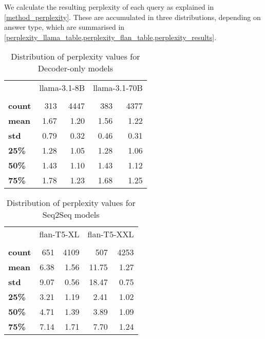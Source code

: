 We calculate the resulting perplexity of each query as explained in \cref{method_perplexity}.
These are accumulated in three distributions, depending on answer type, which are summarised in \cref{perplexity_llama_table,perplexity_flan_table,perplexity_results}.

\begin{table}[ht]
	\centering
	\footnotesize
	\begin{tabular}{>{\bfseries}l | r r | r r}
		\toprule
			& \multicolumn{2}{|c}{\ttfamily llama-3.1-8B} & \multicolumn{2}{|c}{\ttfamily llama-3.1-70B} \\
			& \Parametric{} & \Contextual{} & \Parametric{} & \Contextual{} \\
		\midrule
			count &  313 & 4447 &  383 & 4377  \\
			mean  & 1.67 & 1.20 & 1.56 & 1.22  \\
			std   & 0.79 & 0.32 & 0.46 & 0.31  \\
			25\%  & 1.28 & 1.05 & 1.28 & 1.06  \\
			50\%  & 1.43 & 1.10 & 1.43 & 1.12  \\
			75\%  & 1.78 & 1.23 & 1.68 & 1.25  \\
		\bottomrule
	\end{tabular}
	\caption{Distribution of perplexity values for Decoder-only models}
	\label{perplexity_llama_table}
\end{table}

\begin{table}[ht]
	\centering
	\footnotesize
	\begin{tabular}{>{\bfseries}l | r r | r r}
		\toprule
			& \multicolumn{2}{|c}{\ttfamily flan-T5-XL} & \multicolumn{2}{|c}{\ttfamily flan-T5-XXL} \\
			& \Parametric{} & \Contextual{} & \Parametric{} & \Contextual{} \\
		\midrule
			count &  651 & 4109 &   507 & 4253 \\
			mean  & 6.38 & 1.56 & 11.75 & 1.27 \\
			std   & 9.07 & 0.56 & 18.47 & 0.75 \\
			25\%  & 3.21 & 1.19 &  2.41 & 1.02 \\
			50\%  & 4.71 & 1.39 &  3.89 & 1.09 \\
			75\%  & 7.14 & 1.71 &  7.70 & 1.24 \\
		\bottomrule
	\end{tabular}
	\caption{Distribution of perplexity values for Seq2Seq models}
	\label{perplexity_flan_table}
\end{table}

